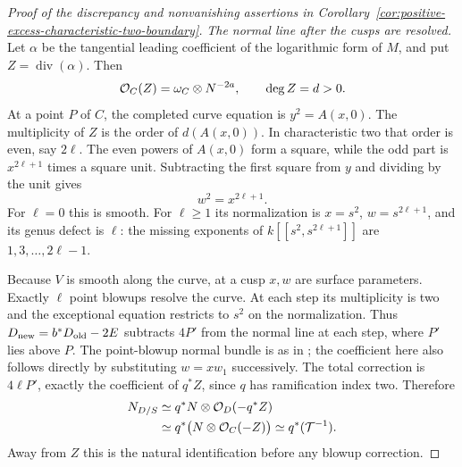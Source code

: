 \begin{proof}[Proof of the discrepancy and nonvanishing assertions in Corollary~\ref{cor:positive-excess-characteristic-two-boundary}]
\smallskip\noindent
\emph{The normal line after the cusps are resolved.}
Let $\alpha$ be the tangential leading coefficient of the
logarithmic form of $M$, and put $Z=\operatorname{div}(\alpha)$.
Then
\begin{equation}\label{eq:boundary-leading-divisor}
 \mathcal O_C(Z)=\omega_C\otimes N^{-2a},\qquad \deg Z=d>0.
\end{equation}
At a point $P$ of $C$, the completed curve equation is
$y^2=A(x,0)$. The multiplicity of $Z$ is the order of
$d(A(x,0))$. In characteristic two that order is even, say
$2\ell$. The even powers of $A(x,0)$ form a square, while
the odd part is $x^{2\ell+1}$ times a square unit. Subtracting
the first square from $y$ and dividing by the unit gives
\[
 w^2=x^{2\ell+1}.
\]
For $\ell=0$ this is smooth. For $\ell\geq1$ its normalization
is $x=s^2$, $w=s^{2\ell+1}$, and its genus defect is $\ell$:
the missing exponents of $k[[s^2,s^{2\ell+1}]]$ are
$1,3,\ldots,2\ell-1$.

Because $V$ is smooth along the curve, at a cusp $x,w$ are
surface parameters. Exactly $\ell$ point blowups resolve the
curve. At each step its multiplicity is two and the exceptional
equation restricts to $s^2$ on the normalization. Thus
$D_{\rm new}=b^*D_{\rm old}-2E$ subtracts $4P'$ from the
normal line at each step, where $P'$ lies above $P$.
The point-blowup normal bundle is as in
\cite[Tag~0AGQ]{Stacks}; the coefficient here also follows
directly by substituting $w=xw_1$ successively.
The total correction is $4\ell P'$, exactly the coefficient
of $q^*Z$, since $q$ has ramification index two. Therefore
\begin{equation}\label{eq:boundary-normal-line}
 \begin{aligned}
 N_{D/S}
 &\simeq q^*N\otimes\mathcal O_D(-q^*Z)\\
 &\simeq q^*\bigl(N\otimes\mathcal O_C(-Z)\bigr)
 \simeq q^*(\mathcal T^{-1}).
 \end{aligned}
\end{equation}
Away from $Z$ this is the natural identification before any
blowup correction.


\end{proof}
